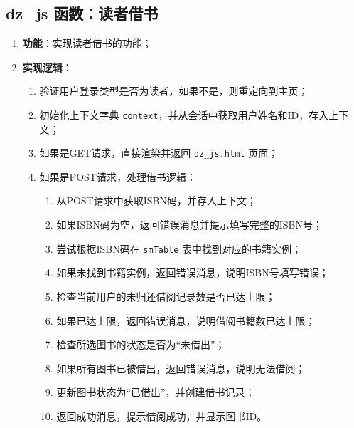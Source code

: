 \documentclass{ctexart}
\begin{document}
\subsection{dz\_js 函数：读者借书}
\begin{enumerate}
    \item \textbf{功能}：实现读者借书的功能；
    \item \textbf{实现逻辑}：
    \begin{enumerate}
        \item 验证用户登录类型是否为读者，如果不是，则重定向到主页；
        \item 初始化上下文字典 \texttt{context}，并从会话中获取用户姓名和ID，存入上下文；
        \item 如果是GET请求，直接渲染并返回 \texttt{dz\_js.html} 页面；
        \item 如果是POST请求，处理借书逻辑：
        \begin{enumerate}
            \item 从POST请求中获取ISBN码，并存入上下文；
            \item 如果ISBN码为空，返回错误消息并提示填写完整的ISBN号；
            \item 尝试根据ISBN码在 \texttt{smTable} 表中找到对应的书籍实例；
            \item 如果未找到书籍实例，返回错误消息，说明ISBN号填写错误；
            \item 检查当前用户的未归还借阅记录数是否已达上限；
            \item 如果已达上限，返回错误消息，说明借阅书籍数已达上限；
            \item 检查所选图书的状态是否为“未借出”；
            \item 如果所有图书已被借出，返回错误消息，说明无法借阅；
            \item 更新图书状态为“已借出”，并创建借书记录；
            \item 返回成功消息，提示借阅成功，并显示图书ID。
        \end{enumerate}
    \end{enumerate}
\end{enumerate}
\end{document}

